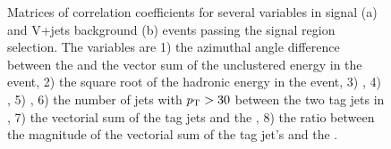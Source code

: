 \begin{figure}
  \caption{Matrices of correlation coefficients for several variables in signal (a) and V+jets background (b) events passing the signal region selection. The variables are 1) the azimuthal angle difference between the \METnoMU and the vector sum of the unclustered energy in the event, 2) the square root of the hadronic energy in the event, 3) \METsig, 4) \METnoMU, 5) \Mjj, 6) the number of jets with $p_{\mathrm{T}}>30$ \GeV between the two tag jets in \eta, 7) the vectorial sum of the tag jets \pt and the \METnoMU, 8) the ratio between the magnitude of the vectorial sum of the tag jet's \pt and the \METnoMU.}
  \label{fig:parkedmvacorr}
\end{figure}

